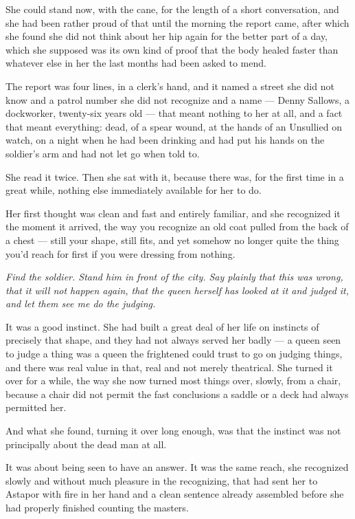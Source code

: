 She could stand now, with the cane, for the length of a short conversation, and she had been rather proud of that until the morning the report came, after which she found she did not think about her hip again for the better part of a day, which she supposed was its own kind of proof that the body healed faster than whatever else in her the last months had been asked to mend.

The report was four lines, in a clerk’s hand, and it named a street she did not know and a patrol number she did not recognize and a name — Denny Sallows, a dockworker, twenty-six years old — that meant nothing to her at all, and a fact that meant everything: dead, of a spear wound, at the hands of an Unsullied on watch, on a night when he had been drinking and had put his hands on the soldier’s arm and had not let go when told to.

She read it twice. Then she sat with it, because there was, for the first time in a great while, nothing else immediately available for her to do.

\sceneBreak

Her first thought was clean and fast and entirely familiar, and she recognized it the moment it arrived, the way you recognize an old coat pulled from the back of a chest — still your shape, still fits, and yet somehow no longer quite the thing you’d reach for first if you were dressing from nothing.

\textit{Find the soldier. Stand him in front of the city. Say plainly that this was wrong, that it will not happen again, that the queen herself has looked at it and judged it, and let them see me do the judging.}

It was a good instinct. She had built a great deal of her life on instincts of precisely that shape, and they had not always served her badly — a queen seen to judge a thing was a queen the frightened could trust to go on judging things, and there was real value in that, real and not merely theatrical. She turned it over for a while, the way she now turned most things over, slowly, from a chair, because a chair did not permit the fast conclusions a saddle or a deck had always permitted her.

And what she found, turning it over long enough, was that the instinct was not principally about the dead man at all.

It was about being seen to have an answer. It was the same reach, she recognized slowly and without much pleasure in the recognizing, that had sent her to Astapor with fire in her hand and a clean sentence already assembled before she had properly finished counting the masters.

